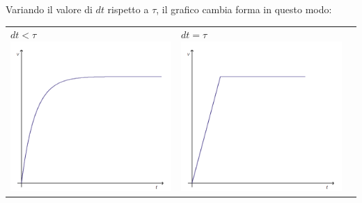 \documentclass[11pt]{article} %
\begin{document}
Variando il valore di $dt$ rispetto a $\tau$, il grafico cambia forma in questo modo:\par
\begin{table}[h]
\begin{tabular}{lll}
$dt < \tau$ \includegraphics[scale=0.4]{1.png} & $dt = \tau$ \includegraphics[scale=0.4]{2.png} \\

\end{tabular}
\end{table}
\end{document}
